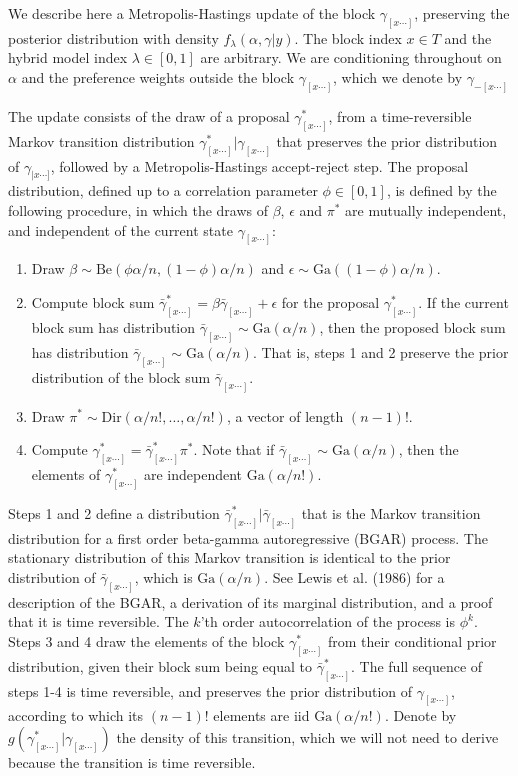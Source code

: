 \documentclass[11pt,letter]{article}
\begin{document}
We describe here a Metropolis-Hastings update of the block $\gamma_{[x\cdots]}$, preserving the posterior distribution with density $f_\lambda(\alpha,\gamma|y)$.
The block index $x \in T$ and the hybrid model index $\lambda \in [0,1]$ are arbitrary.
We are conditioning throughout on $\alpha$ and the preference weights outside the block $\gamma_{[x\cdots]}$, which we denote by $\gamma_{-[x\cdots]}$

The update consists of the draw of a proposal $\gamma_{[x\cdots]}^*$, from a time-reversible Markov transition distribution $\gamma_{[x\cdots]}^*|\gamma_{[x\cdots]}$ that preserves the prior distribution of $\gamma_{|x\cdots]}$, followed by a Metropolis-Hastings accept-reject step.
The proposal distribution, defined up to a correlation parameter $\phi \in [0,1]$, is defined by the following procedure, in which the draws of $\beta$, $\epsilon$ and $\pi^*$ are mutually independent, and independent of the current state $\gamma_{[x\cdots]}$:
\begin{enumerate}
    \item Draw $\beta \sim \mathrm{Be}(\phi \alpha/n, (1-\phi) \alpha/n)$ and $\epsilon \sim \mathrm{Ga}((1-\phi) \alpha/n)$.
    \item Compute block sum $\bar\gamma_{[x\cdots]}^* = \beta \bar\gamma_{[x\cdots]} + \epsilon$ for the proposal $\gamma_{[x\cdots]}^*$.
    If the current block sum has distribution $\bar\gamma_{[x\cdots]} \sim \mathrm{Ga}(\alpha/n)$, then the proposed block sum has distribution $\bar\gamma_{[x\cdots]} \sim \mathrm{Ga}(\alpha/n)$. That is, steps 1 and 2 preserve the prior distribution of the block sum $\bar\gamma_{[x\cdots]}$.
    \item Draw $\pi^* \sim \mathrm{Dir}(\alpha/n!,\ldots,\alpha/n!)$, a vector of length $(n-1)!$.
    \item Compute $\gamma_{[x\cdots]}^* = \bar\gamma_{[x\cdots]}^* \pi^*$.
    Note that if $\bar\gamma_{[x\cdots]} \sim \mathrm{Ga}(\alpha/n)$, then the elements of $\gamma_{[x\cdots]}^*$ are independent
    $\mathrm{Ga}(\alpha/n!)$.
\end{enumerate}
Steps 1 and 2 define a distribution $\bar\gamma_{[x\cdots]}^* | \bar\gamma_{[x\cdots]}$ that is the Markov transition distribution for a first order beta-gamma autoregressive (BGAR) process.
The stationary distribution of this Markov transition is identical to the prior distribution of $\bar\gamma_{[x\cdots]}$, which is $\mathrm{Ga}(\alpha/n)$.
See Lewis et al. (1986) for a description of the BGAR, a derivation of its marginal distribution, and a proof that it is time reversible.
The $k$'th order autocorrelation of the process is $\phi^k$.
Steps 3 and 4 draw the elements of the block $\gamma^*_{[x\cdots]}$ from their conditional prior distribution, given their block sum being equal to $\bar\gamma^*_{[x\cdots]}$.
The full sequence of steps 1-4 is time reversible, and preserves the prior distribution of $\gamma_{[x\cdots]}$,
according to which its $(n-1)!$ elements are iid $\mathrm{Ga}(\alpha/n!)$.
Denote by $g(\gamma_{[x\cdots]}^*|\gamma_{[x\cdots]})$ the density of this transition, which we will not need to derive because the transition is time reversible.
\end{document}

